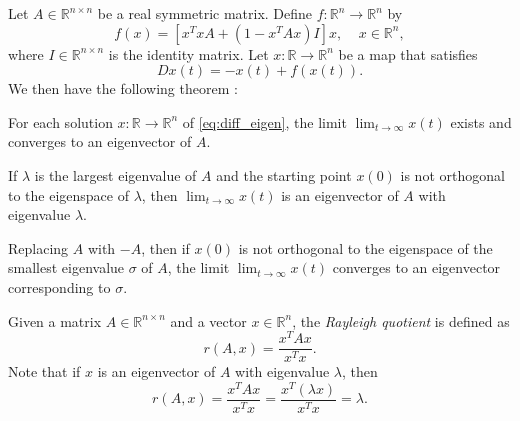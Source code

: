 Let $A\in\mathbb{R}^{n\times n}$ be a real symmetric matrix. Define $f\colon\mathbb{R}^n\to\mathbb{R}^n$ by
\[
f(x)=[x^TxA+(1-x^TAx)I]x,\;\;\;\; x\in\mathbb{R}^n,
\]
where $I\in\mathbb{R}^{n\times n}$ is the identity matrix. Let $x\colon\mathbb{R}\to\mathbb{R}^n$ be a map that satisfies
\begin{equation}\label{eq:diff_eigen}
    Dx(t)=-x(t)+f(x(t)).
\end{equation}
We then have the following theorem \cite{yfh04}:
\begin{theorem}
For each solution $x\colon\mathbb{R}\to\mathbb{R}^n$ of \autoref{eq:diff_eigen}, the limit $\lim_{t\to\infty}x(t)$ exists and converges to an eigenvector of $A$.

If $\lambda$ is the largest eigenvalue of $A$ and the starting point $x(0)$ is not orthogonal to the eigenspace of $\lambda$, then $\lim_{t\to\infty}x(t)$ is an eigenvector of $A$ with eigenvalue $\lambda$.

Replacing $A$ with $-A$, then if $x(0)$ is not orthogonal to the eigenspace of the smallest eigenvalue $\sigma$ of $A$, the limit $\lim_{t\to\infty}x(t)$ converges to an eigenvector corresponding to $\sigma$.
\end{theorem}

\begin{definition}
Given a matrix $A\in\mathbb{R}^{n\times n}$ and a vector $x\in\mathbb{R}^n$, the \emph{Rayleigh quotient} is defined as
\begin{equation*}
    r(A,x) = \frac{x^TAx}{x^Tx}.
\end{equation*}
Note that if $x$ is an eigenvector of $A$ with eigenvalue $\lambda$, then
\begin{equation*}
    r(A,x)=\frac{x^TAx}{x^Tx}=\frac{x^T (\lambda x)}{x^T x}=\lambda.
\end{equation*}
\end{definition}